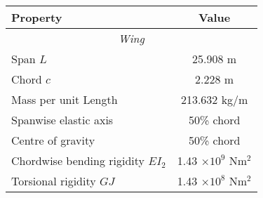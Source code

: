 \documentclass{standalone}
\begin{document}
    \centering
    \begin{tabular}{l c}
    \toprule
    \toprule
    Property&Value\\
    \midrule
    \multicolumn{2}{c}{\textit{Wing}}\\
    Span $L$     & 25.908 m   \\
    Chord $c$   & 2.228 m  \\
    Mass per unit Length     & 213.632 kg/m\\
    Spanwise elastic axis   & 50\% chord\\
    Centre of gravity   & 50\% chord\\
    Chordwise bending rigidity $EI_2$   & 1.43 $\times 10^9$ Nm$^2$\\
    Torsional rigidity $GJ$ & 1.43 $\times 10^8$ Nm$^2$\\
    \bottomrule
    \bottomrule
    \end{tabular}
    
\end{document}
